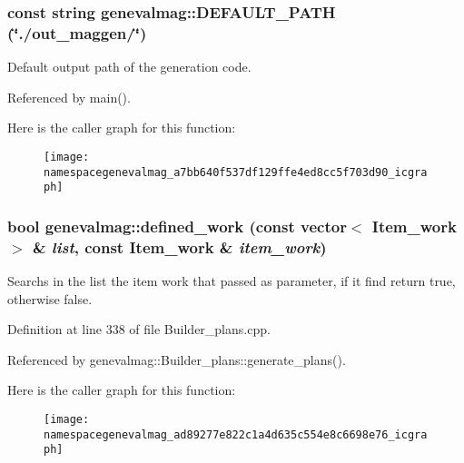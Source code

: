 \hypertarget{namespacegenevalmag_a7bb640f537df129ffe4ed8cc5f703d90}{
\subsubsection[{DEFAULT\_\-PATH}]{\setlength{\rightskip}{0pt plus 5cm}const string genevalmag::DEFAULT\_\-PATH (\char`\"{}./out\_\-maggen/\char`\"{})}}
\label{namespacegenevalmag_a7bb640f537df129ffe4ed8cc5f703d90}
Default output path of the generation code. 

Referenced by main().



Here is the caller graph for this function:\nopagebreak
\begin{figure}[H]
\begin{center}
\leavevmode
\texttt{[image: namespacegenevalmag\_a7bb640f537df129ffe4ed8cc5f703d90\_icgraph]}
\end{center}
\end{figure}


\hypertarget{namespacegenevalmag_ad89277e822c1a4d635c554e8c6698e76}{
\subsubsection[{defined\_\-work}]{\setlength{\rightskip}{0pt plus 5cm}bool genevalmag::defined\_\-work (const vector$<$ Item\_\-work $>$ \& {\em list}, \/  const Item\_\-work \& {\em item\_\-work})}}
\label{namespacegenevalmag_ad89277e822c1a4d635c554e8c6698e76}
Searchs in the list the item work that passed as parameter, if it find return true, otherwise false. 

Definition at line 338 of file Builder\_\-plans.cpp.



Referenced by genevalmag::Builder\_\-plans::generate\_\-plans().



Here is the caller graph for this function:\nopagebreak
\begin{figure}[H]
\begin{center}
\leavevmode
\texttt{[image: namespacegenevalmag\_ad89277e822c1a4d635c554e8c6698e76\_icgraph]}
\end{center}
\end{figure}


